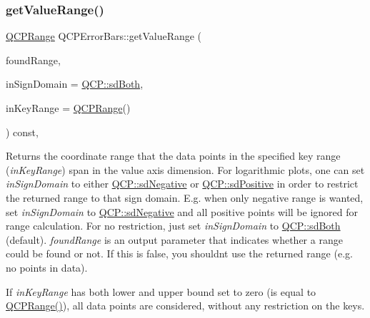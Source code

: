 \subsubsection{\texorpdfstring{get\+Value\+Range()}{getValueRange()}}
{\footnotesize\ttfamily \hyperlink{class_q_c_p_range}{Q\+C\+P\+Range} Q\+C\+P\+Error\+Bars\+::get\+Value\+Range (\begin{DoxyParamCaption}\item[{bool \&}]{found\+Range,  }\item[{\hyperlink{namespace_q_c_p_afd50e7cf431af385614987d8553ff8a9}{Q\+C\+P\+::\+Sign\+Domain}}]{in\+Sign\+Domain = {\ttfamily \hyperlink{namespace_q_c_p_afd50e7cf431af385614987d8553ff8a9aa38352ef02d51ddfa4399d9551566e24}{Q\+C\+P\+::sd\+Both}},  }\item[{const \hyperlink{class_q_c_p_range}{Q\+C\+P\+Range} \&}]{in\+Key\+Range = {\ttfamily \hyperlink{class_q_c_p_range}{Q\+C\+P\+Range}()} }\end{DoxyParamCaption}) const\hspace{0.3cm}{\ttfamily [protected]}, {\ttfamily [virtual]}}

Returns the coordinate range that the data points in the specified key range ({\itshape in\+Key\+Range}) span in the value axis dimension. For logarithmic plots, one can set {\itshape in\+Sign\+Domain} to either \hyperlink{namespace_q_c_p_afd50e7cf431af385614987d8553ff8a9a2d18af0bc58f6528d1e82ce699fe4829}{Q\+C\+P\+::sd\+Negative} or \hyperlink{namespace_q_c_p_afd50e7cf431af385614987d8553ff8a9a584784b75fb816abcc627cf743bb699f}{Q\+C\+P\+::sd\+Positive} in order to restrict the returned range to that sign domain. E.\+g. when only negative range is wanted, set {\itshape in\+Sign\+Domain} to \hyperlink{namespace_q_c_p_afd50e7cf431af385614987d8553ff8a9a2d18af0bc58f6528d1e82ce699fe4829}{Q\+C\+P\+::sd\+Negative} and all positive points will be ignored for range calculation. For no restriction, just set {\itshape in\+Sign\+Domain} to \hyperlink{namespace_q_c_p_afd50e7cf431af385614987d8553ff8a9aa38352ef02d51ddfa4399d9551566e24}{Q\+C\+P\+::sd\+Both} (default). {\itshape found\+Range} is an output parameter that indicates whether a range could be found or not. If this is false, you shouldn\textquotesingle{}t use the returned range (e.\+g. no points in data).

If {\itshape in\+Key\+Range} has both lower and upper bound set to zero (is equal to {\ttfamily \hyperlink{class_q_c_p_range}{Q\+C\+P\+Range()}}), all data points are considered, without any restriction on the keys.

